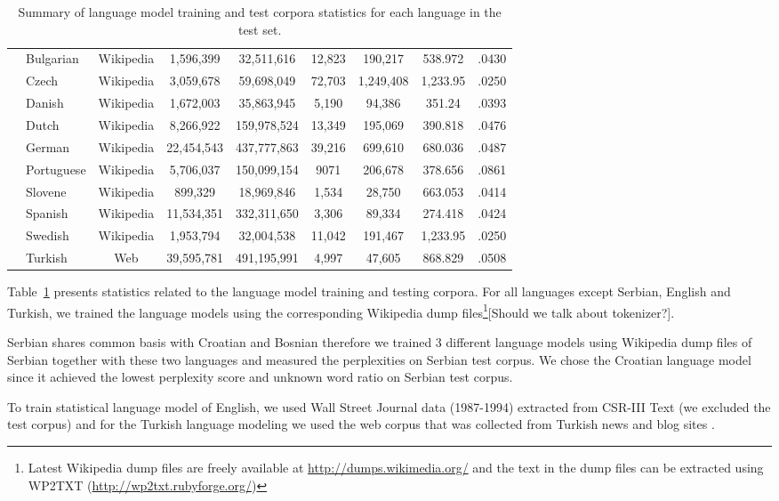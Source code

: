 \begin{table}[h]
\begin{tabular}{l|l|c|c|c|c|c|c|c|}
    &Bulgarian& Wikipedia &1,596,399 & 32,511,616  & 12,823 & 190,217 & 538.972 & .0430\\
    &Czech & Wikipedia &3,059,678 & 59,698,049 & 72,703 & 1,249,408 & 1,233.95 &.0250\\
    &Danish & Wikipedia &1,672,003 & 35,863,945 & 5,190 & 94,386 & 351.24 & .0393\\
    &Dutch & Wikipedia &8,266,922 & 159,978,524 & 13,349 & 195,069 & 390.818 & .0476\\
    &German & Wikipedia &22,454,543&437,777,863 & 39,216 & 699,610 & 680.036 & .0487\\
    &Portuguese & Wikipedia & 5,706,037 & 150,099,154 & 9071 & 206,678 & 378.656 & .0861\\
    &Slovene & Wikipedia & 899,329 & 18,969,846 & 1,534 & 28,750 & 663.053 & .0414\\
    &Spanish & Wikipedia &11,534,351 & 332,311,650& 3,306 & 89,334 & 274.418 & .0424\\
    &Swedish & Wikipedia &1,953,794 & 32,004,538& 11,042 & 191,467 & 1,233.95 & .0250\\
    &Turkish & Web &39,595,781 & 491,195,991& 4,997 & 47,605 & 868.829 & .0508\\
    \hline
  \end{tabular}
  \caption{Summary of language model training and test corpora
  statistics for each language in the test set.}
  \label{tab:lmstatistics}
\end{table}

\noindent Table~\ref{tab:lmstatistics} presents statistics related to the
language model training and testing corpora.  For all languages except
Serbian, English and Turkish, we trained the language models using the
corresponding Wikipedia dump files\footnote{Latest Wikipedia dump
files are freely available at \url{http://dumps.wikimedia.org/} and
the text in the dump files can be extracted using WP2TXT
(\url{http://wp2txt.rubyforge.org/})}[Should we talk about
tokenizer?].

Serbian shares common basis with Croatian and Bosnian therefore we
trained 3 different language models using Wikipedia dump files of
Serbian together with these two languages and measured the
perplexities on Serbian test corpus.  We chose the Croatian language
model since it achieved the lowest perplexity score and unknown word
ratio on Serbian test corpus.

To train statistical language model of English, we used Wall Street
Journal data (1987-1994) extracted from CSR-III Text \cite{csr3text}
(we excluded the test corpus) and for the Turkish language modeling
we used the web corpus that was collected from Turkish news and blog
sites \cite{sak2008turkish}.  

